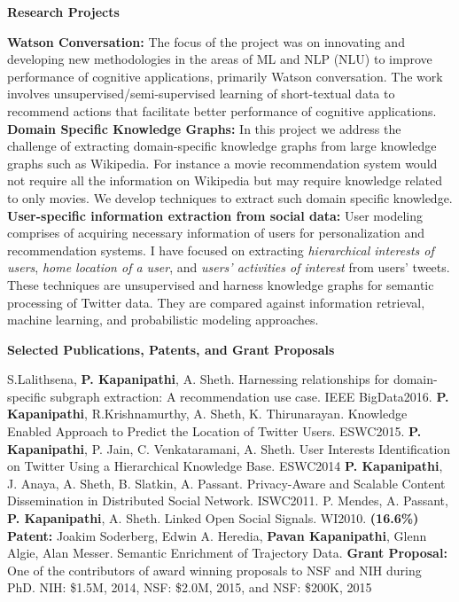 \documentclass[letterpaper,10pt]{article}
\newcommand{\resheading}[1]{{\colorbox{mygrey}{\begin{minipage}{\textwidth}{\textbf{#1 \vphantom{p\^{E}}}}\end{minipage}}}}
\begin{document}
\resheading{Research Projects}\vspace{0.05in}
\textbf{Watson Conversation:} The focus of the project was on innovating and developing new methodologies in the areas of ML and NLP (NLU) to improve performance of cognitive applications, primarily Watson conversation. The work involves unsupervised/semi-supervised learning of short-textual data to recommend actions that facilitate better performance of cognitive applications. \linebreak
\textbf{Domain Specific Knowledge Graphs: } In this project we address the challenge of extracting domain-specific knowledge graphs from large knowledge graphs such as Wikipedia. For instance a movie recommendation system would not require all the information on Wikipedia but may require knowledge related to only movies. We develop techniques to extract such domain specific knowledge. \linebreak
\textbf{User-specific information extraction from social data: } User modeling comprises of acquiring necessary information of users for personalization and recommendation systems. I have focused on extracting \textit{hierarchical interests of users}, \textit{home location of a user}, and \textit{users' activities of interest} from users' tweets. These techniques are unsupervised and harness knowledge graphs for semantic processing of Twitter data. They are compared against information retrieval, machine learning, and probabilistic modeling approaches. \linebreak \vspace{0.05in}

\resheading{Selected Publications, Patents, and Grant Proposals}\vspace{0.05in}
S.Lalithsena, \textbf{P. Kapanipathi}, A. Sheth. Harnessing relationships for domain-specific subgraph extraction: A recommendation use case. IEEE BigData2016.\linebreak
\textbf{P. Kapanipathi}, R.Krishnamurthy, A. Sheth, K. Thirunarayan. Knowledge Enabled Approach to Predict the Location of Twitter Users. ESWC2015. \linebreak
\textbf{P. Kapanipathi}, P. Jain, C. Venkataramani, A. Sheth. User Interests Identification on Twitter Using a Hierarchical Knowledge Base. ESWC2014 \linebreak
\textbf{P. Kapanipathi}, J. Anaya, A. Sheth, B. Slatkin, A. Passant. Privacy-Aware and Scalable Content Dissemination in Distributed Social Network. ISWC2011. \linebreak
P. Mendes, A. Passant, \textbf{P. Kapanipathi}, A. Sheth. Linked Open Social Signals. WI2010. \textbf{(16.6\%)}\linebreak
\textbf{Patent:} Joakim Soderberg, Edwin A. Heredia, \textbf{Pavan Kapanipathi}, Glenn Algie,  Alan Messer. Semantic Enrichment of Trajectory Data. \linebreak
\textbf{Grant Proposal: }  One of the contributors of award winning proposals to NSF and NIH during PhD. NIH: \$1.5M, 2014, NSF: \$2.0M, 2015, and NSF: \$200K, 2015\vspace{0.05in}
\end{document}
